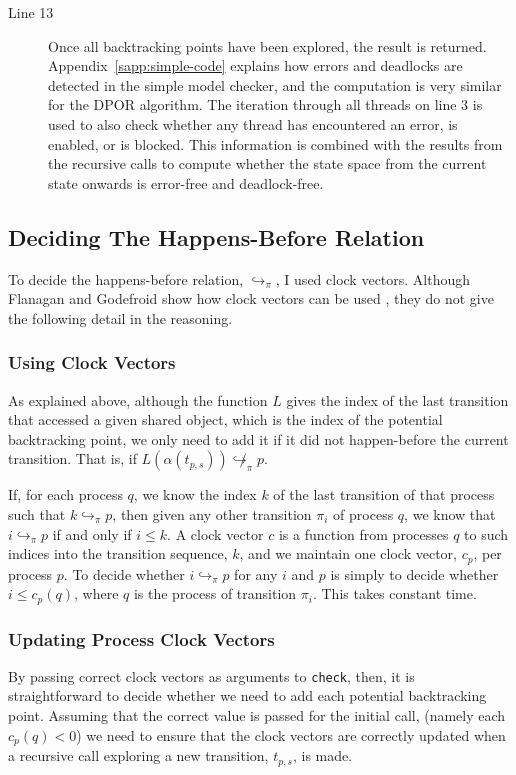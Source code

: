 \documentclass[12pt,a4paper,twoside,openright]{report}
\begin{document}
\begin{description}
	\item[Line 13] Once all backtracking points have been
	explored, the result is returned.
	Appendix~\ref{sapp:simple-code} explains
	how errors and deadlocks are
	detected in the simple model checker,
	and the computation is very similar
	for the DPOR algorithm. The iteration
	through all threads on line 3 is used
	to also check whether any thread has
	encountered an error, is enabled,
	or is blocked.
	This information is combined with the
	results from the recursive calls to
	compute whether the state space from
	the current state onwards is error-free
	and deadlock-free.

\end{description}

\subsection{Deciding The Happens-Before Relation}
\label{sec:clock-vectors}

To decide the happens-before relation,
$\hookrightarrow_\pi$, I used clock vectors.
Although Flanagan
and Godefroid show how clock vectors
can be used \cite{flan05},
they do not give the
following detail in the
reasoning.

\subsubsection{Using Clock Vectors}

As explained above, although
the function $L$ gives the index
of the last transition that accessed a given shared
object, which is the index of the potential backtracking
point, we only need to add it if it
did not happen-before the current transition.
That is, if
$L(\alpha(t_{p,s})) \not\hookrightarrow_\pi p$.

If, for each process
$q$, we know the index $k$ of the last transition of that
process such that $k \hookrightarrow_\pi p$,
then given any other transition $\pi_i$ of
process $q$, we know that
$i \hookrightarrow_\pi p$ if and only if
$i \leq k$. A clock vector $c$ is
a function from processes $q$ to such
indices into the transition sequence, $k$,
and we maintain one clock vector, $c_p$, per
process $p$. To decide whether
$i \hookrightarrow_\pi p$ for
any $i$ and $p$ is simply to decide
whether $i \leq c_p(q)$, where $q$ is
the process of transition $\pi_i$.
This takes constant time.

\subsubsection{Updating Process Clock Vectors}
By passing correct clock vectors as arguments to
\texttt{check}, then, it is straightforward
to decide whether we need to add each potential
backtracking point.
Assuming that the correct value is passed for
the initial call,
(namely each $c_p(q) < 0$)
we need to ensure that the
clock vectors are correctly updated when
a recursive call exploring a new transition,
$t_{p,s}$, is made.
\end{document}
